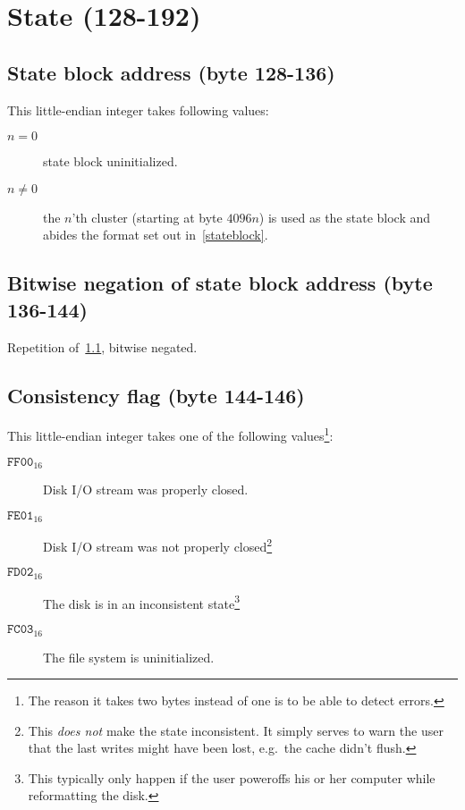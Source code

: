 \documentclass[11pt,a4paper]{report}
\newcommand{\clustersize}{4096 }
\begin{document}
        \section{State (128-192)}
        \subsection{State block address (byte 128-136)}
        \label{header:stateblock}
        This little-endian integer takes following values:

        \begin{description}
            \item [$n = 0$]    state block uninitialized.
            \item [$n \neq 0$] the $n$'th cluster (starting at byte
                $\clustersize n$) is used as the state block and abides the
                format set out in~\ref{stateblock}.
        \end{description}

        \subsection{Bitwise negation of state block address (byte 136-144)}
        Repetition of~\ref{header:stateblock}, bitwise negated.

        \subsection{Consistency flag (byte 144-146)}
        \label{header:consistency}
        This little-endian integer takes one of the following
        values\footnote{The reason it takes two bytes instead of one is to be
        able to detect errors.}:

        \begin{description}
            \item [$\texttt{FF00}_{16}$] Disk I/O stream was properly closed.
            \item [$\texttt{FE01}_{16}$] Disk I/O stream was not properly
                closed\footnote{This \emph{does not} make the state
                inconsistent. It simply serves to warn the user that the last
                writes might have been lost, e.g.\ the cache didn't flush.}
            \item [$\texttt{FD02}_{16}$] The disk is in an inconsistent
                state\footnote{This typically only happen if the user poweroffs
                his or her computer while reformatting the disk.}
            \item [$\texttt{FC03}_{16}$] The file system is uninitialized.
        \end{description}
\end{document}
